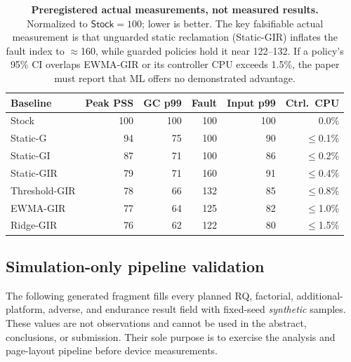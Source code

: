 \documentclass[acmsmall,screen]{acmart}
\begin{document}
\begin{table}[t]
  \caption{\textbf{Preregistered actual measurements, not measured results.}
  Normalized to $\textsf{Stock}=100$; lower is better. The key falsifiable
  actual measurement is that unguarded static reclamation (\textsf{Static-GIR})
  inflates the fault index to $\approx$160, while guarded policies hold it
  near 122--132. If a policy's 95\% CI overlaps \textsf{EWMA-GIR} or its
  controller CPU exceeds 1.5\%, the paper must report that ML offers no
  demonstrated advantage.}
  \label{tab:actual}
  \small
  \begin{tabular}{@{}lrrrrr@{}}
    \toprule
    \textbf{Baseline} & \textbf{Peak PSS} & \textbf{GC p99} &
    \textbf{Fault} & \textbf{Input p99} & \textbf{Ctrl.\ CPU} \\
    \midrule
    \textsf{Stock}         & 100 & 100 & 100 & 100 & 0.0\% \\
    \textsf{Static-G}      &  94 &  75 & 100 &  90 & $\le$0.1\% \\
    \textsf{Static-GI}     &  87 &  71 & 100 &  86 & $\le$0.2\% \\
    \textsf{Static-GIR}    &  79 &  71 & 160 &  91 & $\le$0.4\% \\
    \textsf{Threshold-GIR} &  78 &  66 & 132 &  85 & $\le$0.8\% \\
    \textsf{EWMA-GIR}      &  77 &  64 & 125 &  82 & $\le$1.0\% \\
    \textsf{Ridge-GIR}     &  76 &  62 & 122 &  80 & $\le$1.5\% \\
    \bottomrule
  \end{tabular}
\end{table}



\subsection{Simulation-only pipeline validation}
\label{sec:simulated-results}
The following generated fragment fills every planned RQ, factorial,
additional-platform, adverse, and endurance result field with fixed-seed
\emph{synthetic} samples. These values are not observations and cannot be
used in the abstract, conclusions, or submission. Their sole purpose is to
exercise the analysis and page-layout pipeline before device measurements.

\else

\fi
\end{document}
